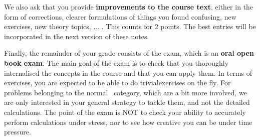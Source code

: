 We also ask that you provide \textbf{improvements to the course text}, either in the form of corrections, clearer formulations of things you found confusing, new exercises, new theory topics, ... . This counts for 2 points. The best entries will be incorporated in the next version of these notes.

Finally, the remainder of your grade consists of the exam, which is an \textbf{oral open book exam}. The main goal of the exam is to check that you thoroughly internalised the concepts in the course and that you can apply them. In terms of exercises, you are expected to be able to do trivial\iconoffset\trivial exercises on the fly. For problems belonging to the normal \iconoffset\normal\, category, which are a bit more involved, we are only interested in your general strategy to tackle them, and not the detailed calculations. The point of the exam is NOT to check your ability to accurately perform calculations under stress, nor to see how creative you can be under time pressure. 

